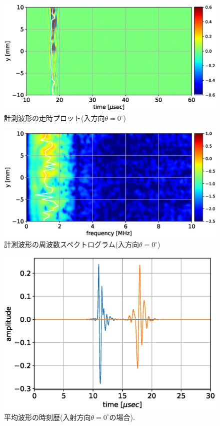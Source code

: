 \begin{figure}[h]
	\begin{center}
	\includegraphics[width=0.7\linewidth]{Figs/fig6.eps} 
	\end{center}
	\caption{
		計測波形の走時プロット(入方向$\theta=0^{\circ}$)
	} 
	\label{fig:fig6}
\end{figure}
\begin{figure}[h]
	\begin{center}
	\includegraphics[width=0.7\linewidth]{Figs/fig7.eps} 
	\end{center}
	\caption{
		計測波形の周波数スペクトログラム(入方向$\theta=0^{\circ}$)
	} 
	\label{fig:fig7}
\end{figure}
\begin{figure}[h]
	\begin{center}
	\includegraphics[width=0.6\linewidth]{Figs/fig8.eps} 
	\end{center}
	\caption{
		平均波形の時刻歴(入射方向$\theta=0^{\circ}$の場合).
	} 
	\label{fig:fig8}
\end{figure}
